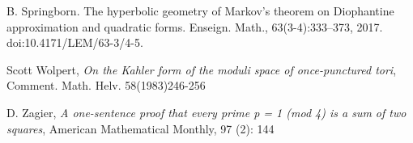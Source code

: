 \documentclass[12pt,a4paper]{amsart}
\begin{document}
B. Springborn. The hyperbolic geometry of Markov's theorem on
Diophantine approximation and quadratic forms. Enseign. Math.,
63(3-4):333--373, 2017. doi:10.4171/LEM/63-3/4-5.

Scott Wolpert,
\textit{On the Kahler form of the moduli space of once-punctured tori}, 
Comment. Math. Helv. 58(1983)246-256

D. Zagier,
 \textit{A one-sentence proof that every prime p = 1 (mod 4) is a sum of two squares}, 
 American Mathematical Monthly, 97 (2): 144
 
 




%
%
%
%
%
%
%
%



% 
 
\end{document}
